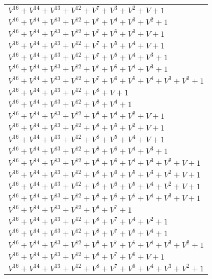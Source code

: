 \documentclass[12pt]{article}
\begin{document}
\begin{adjustwidth}{-4cm}{}
\begin{center}
\begin{longtable}{|l|}
$V^{16}  +V^{14}  +V^{13}  +V^{12}  +V^{7}  +V^{3}  +V^{2}  + V + 1$ \\
$V^{16}  +V^{14}  +V^{13}  +V^{12}  +V^{7}  +V^{4}  +V^{3}  +V^{2}  + 1$ \\
$V^{16}  +V^{14}  +V^{13}  +V^{12}  +V^{7}  +V^{5}  +V^{3}  + V + 1$ \\
$V^{16}  +V^{14}  +V^{13}  +V^{12}  +V^{7}  +V^{5}  +V^{4}  + V + 1$ \\
$V^{16}  +V^{14}  +V^{13}  +V^{12}  +V^{7}  +V^{5}  +V^{4}  +V^{3}  + 1$ \\
$V^{16}  +V^{14}  +V^{13}  +V^{12}  +V^{7}  +V^{6}  +V^{4}  +V^{3}  + 1$ \\
$V^{16}  +V^{14}  +V^{13}  +V^{12}  +V^{7}  +V^{6}  +V^{5}  +V^{4}  +V^{3}  +V^{2}  + 1$ \\
$V^{16}  +V^{14}  +V^{13}  +V^{12}  +V^{8}  + V + 1$ \\
$V^{16}  +V^{14}  +V^{13}  +V^{12}  +V^{8}  +V^{4}  + 1$ \\
$V^{16}  +V^{14}  +V^{13}  +V^{12}  +V^{8}  +V^{4}  +V^{2}  + V + 1$ \\
$V^{16}  +V^{14}  +V^{13}  +V^{12}  +V^{8}  +V^{5}  +V^{2}  + V + 1$ \\
$V^{16}  +V^{14}  +V^{13}  +V^{12}  +V^{8}  +V^{5}  +V^{4}  + V + 1$ \\
$V^{16}  +V^{14}  +V^{13}  +V^{12}  +V^{8}  +V^{6}  +V^{4}  +V^{3}  + 1$ \\
$V^{16}  +V^{14}  +V^{13}  +V^{12}  +V^{8}  +V^{6}  +V^{4}  +V^{3}  +V^{2}  + V + 1$ \\
$V^{16}  +V^{14}  +V^{13}  +V^{12}  +V^{8}  +V^{6}  +V^{5}  +V^{3}  +V^{2}  + V + 1$ \\
$V^{16}  +V^{14}  +V^{13}  +V^{12}  +V^{8}  +V^{6}  +V^{5}  +V^{4}  +V^{2}  + V + 1$ \\
$V^{16}  +V^{14}  +V^{13}  +V^{12}  +V^{8}  +V^{6}  +V^{5}  +V^{4}  +V^{3}  + V + 1$ \\
$V^{16}  +V^{14}  +V^{13}  +V^{12}  +V^{8}  +V^{7}  + 1$ \\
$V^{16}  +V^{14}  +V^{13}  +V^{12}  +V^{8}  +V^{7}  +V^{4}  +V^{2}  + 1$ \\
$V^{16}  +V^{14}  +V^{13}  +V^{12}  +V^{8}  +V^{7}  +V^{5}  +V^{4}  + 1$ \\
$V^{16}  +V^{14}  +V^{13}  +V^{12}  +V^{8}  +V^{7}  +V^{5}  +V^{4}  +V^{3}  +V^{2}  + 1$ \\
$V^{16}  +V^{14}  +V^{13}  +V^{12}  +V^{8}  +V^{7}  +V^{6}  + V + 1$ \\
$V^{16}  +V^{14}  +V^{13}  +V^{12}  +V^{8}  +V^{7}  +V^{6}  +V^{4}  +V^{3}  +V^{2}  + 1$ \\

\end{longtable}
\end{center}
\end{adjustwidth}
\end{document}
